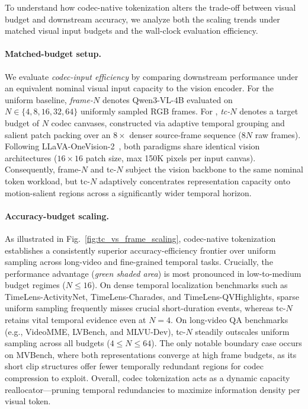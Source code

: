 To understand how codec-native tokenization alters the trade-off between visual budget and downstream accuracy, we analyze both the scaling trends under matched visual input budgets and the wall-clock evaluation efficiency.

\paragraph{Matched-budget setup.}
We evaluate \emph{codec-input efficiency} by comparing downstream performance under an equivalent nominal visual input capacity to the vision encoder. 
For the uniform baseline, \emph{frame-$N$} denotes Qwen3-VL-4B evaluated on $N \in \{4, 8, 16, 32, 64\}$ uniformly sampled RGB frames. For \magevl, \emph{tc-$N$} denotes a target budget of $N$ codec canvases, constructed via adaptive temporal grouping and salient patch packing over an $8\times$ denser source-frame sequence ($8N$ raw frames). Following LLaVA-OneVision-2~\cite{llavaonevision2}, both paradigms share identical vision architectures ($16{\times}16$ patch size, max 150K pixels per input canvas). Consequently, frame-$N$ and tc-$N$ subject the vision backbone to the same nominal token workload, but tc-$N$ adaptively concentrates representation capacity onto motion-salient regions across a significantly wider temporal horizon.



\paragraph{Accuracy-budget scaling.}
As illustrated in Fig.~\ref{fig:tc_vs_frame_scaling}, codec-native tokenization establishes a consistently superior accuracy-efficiency frontier over uniform sampling across long-video and fine-grained temporal tasks. 
Crucially, the performance advantage (\emph{green shaded area}) is most pronounced in low-to-medium budget regimes ($N \le 16$). On dense temporal localization benchmarks such as TimeLens-ActivityNet, TimeLens-Charades, and TimeLens-QVHighlights, sparse uniform sampling frequently misses crucial short-duration events, whereas tc-$N$ retains vital temporal evidence even at $N=4$. 
On long-video QA benchmarks (e.g., VideoMME, LVBench, and MLVU-Dev), tc-$N$ steadily outscales uniform sampling across all budgets ($4 \le N \le 64$). 
The only notable boundary case occurs on MVBench, where both representations converge at high frame budgets, as its short clip structures offer fewer temporally redundant regions for codec compression to exploit. Overall, codec tokenization acts as a dynamic capacity reallocator—pruning temporal redundancies to maximize information density per visual token.



